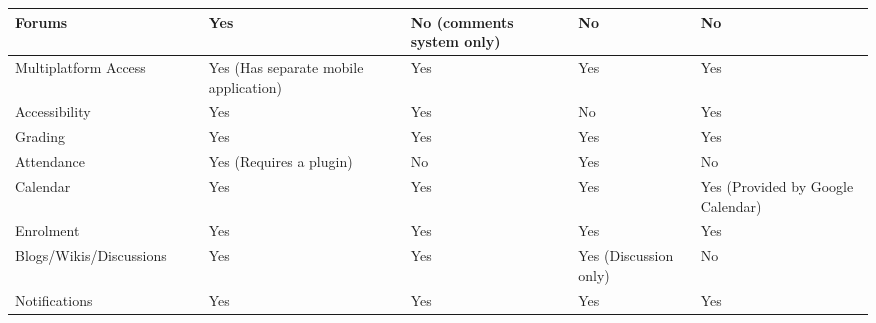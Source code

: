 \begin{table}[ht]
{\begin{tabular}{llllllll}
        \multicolumn{1}{|l|}{Forums}                      & \multicolumn{1}{l|}{} & \multicolumn{1}{l|}{} & \multicolumn{1}{l|}{Yes} & \multicolumn{1}{l|}{} & \multicolumn{1}{l|}{No (comments system only)} & \multicolumn{1}{l|}{No} & \multicolumn{1}{l|}{No} \\ \hline
        \multicolumn{1}{|l|}{Multiplatform Access}        & \multicolumn{1}{l|}{} & \multicolumn{1}{l|}{} & \multicolumn{1}{l|}{Yes (Has separate mobile application)} & \multicolumn{1}{l|}{} & \multicolumn{1}{l|}{Yes}                       & \multicolumn{1}{l|}{Yes} & \multicolumn{1}{l|}{Yes} \\ \hline
        \multicolumn{1}{|l|}{Accessibility}               & \multicolumn{1}{l|}{} & \multicolumn{1}{l|}{} & \multicolumn{1}{l|}{Yes} & \multicolumn{1}{l|}{} & \multicolumn{1}{l|}{Yes}                       & \multicolumn{1}{l|}{No} & \multicolumn{1}{l|}{Yes} \\ \hline
        \multicolumn{1}{|l|}{Grading}                     & \multicolumn{1}{l|}{} & \multicolumn{1}{l|}{} & \multicolumn{1}{l|}{Yes} & \multicolumn{1}{l|}{} & \multicolumn{1}{l|}{Yes}                       & \multicolumn{1}{l|}{Yes} & \multicolumn{1}{l|}{Yes} \\ \hline
        \multicolumn{1}{|l|}{Attendance}                  & \multicolumn{1}{l|}{} & \multicolumn{1}{l|}{} & \multicolumn{1}{l|}{Yes (Requires a plugin)} & \multicolumn{1}{l|}{} & \multicolumn{1}{l|}{No}                        & \multicolumn{1}{l|}{Yes} & \multicolumn{1}{l|}{No} \\ \hline
        \multicolumn{1}{|l|}{Calendar}                    & \multicolumn{1}{l|}{} & \multicolumn{1}{l|}{} & \multicolumn{1}{l|}{Yes} & \multicolumn{1}{l|}{} & \multicolumn{1}{l|}{Yes}                       & \multicolumn{1}{l|}{Yes} & \multicolumn{1}{l|}{Yes (Provided by Google Calendar)} \\ \hline
        \multicolumn{1}{|l|}{Enrolment}                   & \multicolumn{1}{l|}{} & \multicolumn{1}{l|}{} & \multicolumn{1}{l|}{Yes} & \multicolumn{1}{l|}{} & \multicolumn{1}{l|}{Yes}                       & \multicolumn{1}{l|}{Yes} & \multicolumn{1}{l|}{Yes} \\ \hline
        \multicolumn{1}{|l|}{Blogs/Wikis/Discussions}     & \multicolumn{1}{l|}{} & \multicolumn{1}{l|}{} & \multicolumn{1}{l|}{Yes} & \multicolumn{1}{l|}{} & \multicolumn{1}{l|}{Yes}                       & \multicolumn{1}{l|}{Yes (Discussion only)} & \multicolumn{1}{l|}{No} \\ \hline
        \multicolumn{1}{|l|}{Notifications}               & \multicolumn{1}{l|}{} & \multicolumn{1}{l|}{} & \multicolumn{1}{l|}{Yes} & \multicolumn{1}{l|}{} & \multicolumn{1}{l|}{Yes}                       & \multicolumn{1}{l|}{Yes} & \multicolumn{1}{l|}{Yes} \\ \hline

\end{tabular}}
\end{table}
